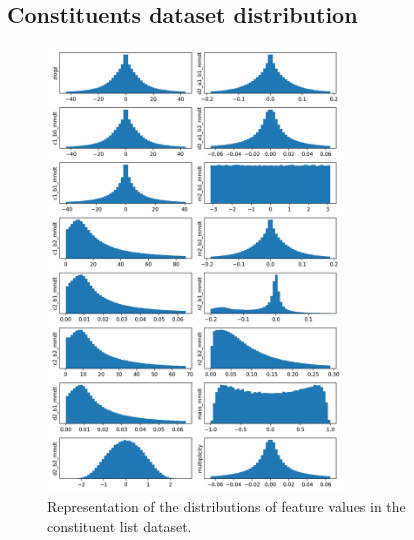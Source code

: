 \begin{appendices}
\chapter{Constituents dataset distribution}
\begin{figure}[hpt!]
  \centering
  \includegraphics[trim={0cm 0cm 0cm 0cm}, width=0.7\textwidth, center]{../logs/constituent_distribution.png}
  \caption{Representation of the distributions of feature values in the constituent list dataset.}
  \label{fig:distributions-constituent}
\end{figure}

\end{appendices}
